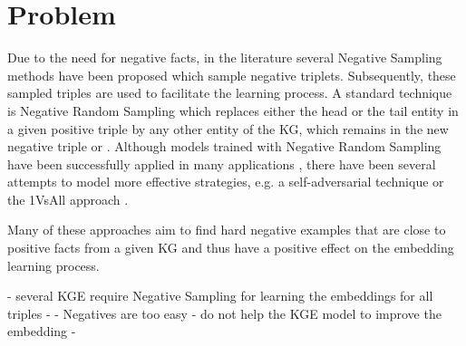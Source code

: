\section{Problem}

Due to the need for negative facts, in the literature several Negative Sampling methods have been proposed which sample negative triplets.
Subsequently, these sampled triples are used to facilitate the learning process. 
A standard technique is Negative Random Sampling which replaces either the head or the tail entity in a given positive triple   by any other entity of the \ac{KG}, which remains in the new negative triple  or . 
Although models trained with Negative Random Sampling have been successfully applied in many applications \cite{TransE}, there have been several attempts to model more effective strategies, e.g. 
a self-adversarial technique \cite{RotatE} or the 1VsAll approach \cite{ConvE}.

Many of these approaches aim to find hard negative examples that are close to positive facts from a given \ac{KG} and thus have a positive effect on the embedding learning process. 


- several KGE require Negative Sampling for learning the embeddings for all triples
- 
- Negatives are too easy
- do not help the \ac{KGE} model to improve the embedding
- 